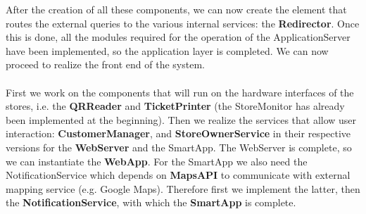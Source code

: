 After the creation of all these components, we can now create the element that routes the external queries to the various internal services: the \textbf{Redirector}.
Once this is done, all the modules required for the operation of the ApplicationServer have been implemented, so the application layer is completed. We can now proceed to realize the front end of the system.\\\\
First we work on the components that will run on the hardware interfaces of the stores, i.e. the \textbf{QRReader} and \textbf{TicketPrinter} (the StoreMonitor has already been implemented at the beginning). Then we realize the services that allow user interaction: \textbf{CustomerManager}, and \textbf{StoreOwnerService} in their respective versions for the \textbf{WebServer} and the SmartApp. The WebServer is complete, so we can instantiate the \textbf{WebApp}. For the SmartApp we also need the NotificationService which depends on \textbf{MapsAPI} to communicate with external mapping service (e.g. Google Maps). Therefore first we implement the latter, then the \textbf{NotificationService}, with which the \textbf{SmartApp} is complete.

